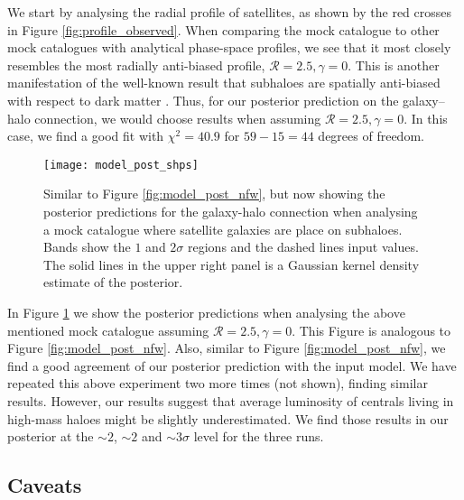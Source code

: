 \documentclass[fleqn,usenatbib,useAMS]{mnras}
\begin{document}
	We start by analysing the radial profile of satellites, as shown by the red crosses in Figure \ref{fig:profile_observed}. When comparing the mock catalogue to other mock catalogues with analytical phase-space profiles, we see that it most closely resembles the most radially anti-biased profile, $\mathcal{R} = 2.5, \gamma = 0$. This is another manifestation of the well-known result that subhaloes are spatially anti-biased with respect to dark matter \citep[see e.g.][]{Diemand+04, vdBosch+16}. Thus, for our posterior prediction on the galaxy--halo connection, we would choose results when assuming $\mathcal{R} = 2.5, \gamma = 0$. In this case, we find a good fit with $\chi^2 = 40.9$ for $59 - 15 = 44$ degrees of freedom.
	\begin{figure}
		\centering
		\texttt{[image: model\_post\_shps]}
		\caption{Similar to Figure \ref{fig:model_post_nfw}, but now showing the posterior predictions for the galaxy-halo connection when analysing a mock catalogue where satellite galaxies are place on subhaloes. Bands show the $1$ and $2\sigma$ regions and the dashed lines input values. The solid lines in the upper right panel is a Gaussian kernel density estimate of the posterior.}
		\label{fig:model_post_shps}
	\end{figure}
	
	In Figure \ref{fig:model_post_shps} we show the posterior predictions when analysing the above mentioned mock catalogue assuming $\mathcal{R} = 2.5, \gamma = 0$. This Figure is analogous to Figure \ref{fig:model_post_nfw}. Also, similar to Figure \ref{fig:model_post_nfw}, we find a good agreement of our posterior prediction with the input model. We have repeated this above experiment two more times (not shown), finding similar results. However, our results suggest that average luminosity of centrals living in high-mass haloes might be slightly underestimated. We find those results in our posterior at the $\sim 2$, $\sim 2$ and $\sim 3\sigma$ level for the three runs.
	
	\subsection{Caveats}
	
\end{document}
